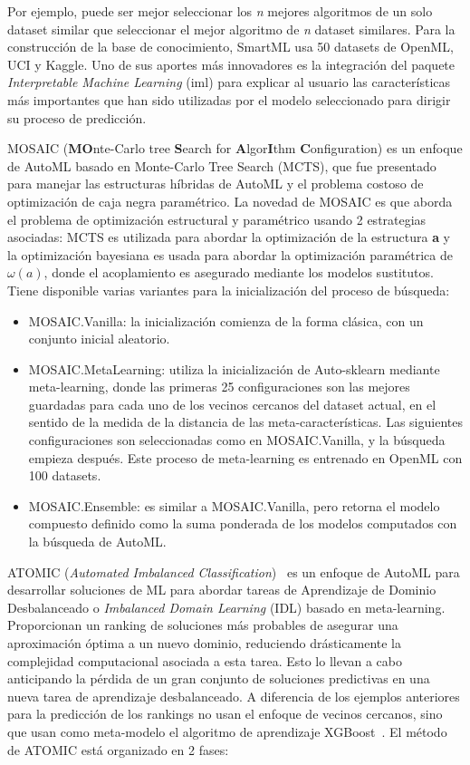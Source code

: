 Por ejemplo, puede ser mejor seleccionar los \textit{n} mejores algoritmos de un solo dataset similar que seleccionar el mejor algoritmo de \textit{n} dataset similares. Para la construcción de la base de conocimiento, SmartML usa 50 datasets de OpenML, UCI y Kaggle. Uno de sus aportes más innovadores es la integración del paquete \textit{Interpretable Machine Learning} (iml) para explicar al usuario las características más importantes que han sido utilizadas por el modelo seleccionado para dirigir su proceso de predicción.

MOSAIC (\textbf{MO}nte-Carlo tree \textbf{S}earch for \textbf{A}lgor\textbf{I}thm \textbf{C}onfiguration) \cite{rakotoarison2019automated} es un enfoque de AutoML basado en Monte-Carlo Tree Search (MCTS), que fue presentado para manejar las estructuras híbridas de AutoML y el problema costoso de optimización de caja negra paramétrico. La novedad de MOSAIC es que aborda el problema de optimización estructural y paramétrico usando 2 estrategias asociadas: MCTS es utilizada para abordar la optimización de la estructura \textbf{a} y la optimización bayesiana es usada para abordar la optimización paramétrica de $\omega(a)$, donde el acoplamiento es asegurado mediante los modelos sustitutos. Tiene disponible varias variantes para la inicialización del proceso de búsqueda:

\begin{itemize}
	\item MOSAIC.Vanilla: la inicialización comienza de la forma clásica, con un conjunto inicial aleatorio.
	\item MOSAIC.MetaLearning: utiliza la inicialización de Auto-sklearn mediante meta-learning, donde las primeras 25 configuraciones son las mejores guardadas para cada uno de los vecinos cercanos del dataset actual, en el sentido de la medida de la distancia de las meta-características. Las siguientes configuraciones son seleccionadas como en MOSAIC.Vanilla, y la búsqueda empieza después. Este proceso de meta-learning es entrenado en OpenML con 100 datasets.
	\item MOSAIC.Ensemble: es similar a MOSAIC.Vanilla, pero retorna el modelo compuesto definido como la suma ponderada de los modelos computados con la búsqueda de AutoML.
\end{itemize}

ATOMIC (\textit{Automated Imbalanced Classification})~\cite{atomic} es un enfoque de AutoML para desarrollar soluciones de ML para abordar tareas de Aprendizaje de Dominio Desbalanceado o \textit{Imbalanced Domain Learning} (IDL) basado en meta-learning. Proporcionan un ranking de soluciones más probables de asegurar una aproximación óptima a un nuevo dominio, reduciendo drásticamente la complejidad computacional asociada a esta tarea. Esto lo llevan a cabo anticipando la pérdida de un gran conjunto de soluciones predictivas en una nueva tarea de aprendizaje desbalanceado. A diferencia de los ejemplos anteriores para la predicción de los rankings no usan el enfoque de vecinos cercanos, sino que usan como meta-modelo el algoritmo de aprendizaje XGBoost~\cite{xgboost}. El método de ATOMIC está organizado en 2 fases:

